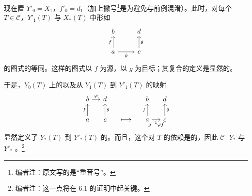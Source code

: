 现在置 $Y'_0=X_1$，$f'_0=d_1$（加上撇号\footnote{编者注：原文写的是“重音号”。}是为避免与前例混淆）。此时，对每个 $T\in\mathcal C$，$Y'_1(T)$ 与 $X_*(T)$ 中形如
\[
\begin{tikzcd}
b&d\\
a\arrow[u,"f"]\arrow[r,"\psi"']&c\arrow[u,"g"']
\end{tikzcd}
\]
的图式的等同。这样的图式以 $f$ 为源，以 $g$ 为目标；其复合的定义是显然的。

于是，$Y_0(T)$ 上的以及从 $Y_1(T)$ 到 $Y'_1(T)$ 的映射
\[
\begin{tikzcd}[column sep=small]
b\arrow[r,"\varphi"]&d&&b&d\\
a\arrow[u,"f"]&c\arrow[u,"g"']&\longmapsto&a\arrow[u,"f"]\arrow[r,"g^{-1}\varphi f"']&c\arrow[u,"g"']
\end{tikzcd}
\]
显然定义了 $Y_*(T)$ 到 $Y'_*(T)$ 的。而且，这个对 $T$ 的依赖是的，因此 $\mathcal C$- $Y_*$ 与 $Y'_*$ 。\footnote{编者注：这一点将在 6.1 的证明中起关键。}

